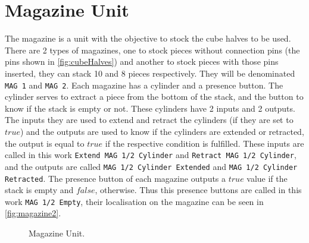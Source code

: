 \section{Magazine Unit}
\label{sec:magazine}
The magazine is a unit with the objective to stock the cube halves to be used.
There are 2 types of magazines, one to stock pieces without connection pins (the pins shown in \autoref{fig:cubeHalves}) and another to
 stock pieces with those pins inserted, they can stack 10 and 8 pieces
 respectively. They will be denominated \verb| MAG 1| and \verb|MAG 2|.
Each magazine has a cylinder and a presence button. The cylinder serves to extract a
piece from the bottom of the stack, and the button to know if the stack is empty
or not. These cylinders have 2 inputs and 2
outputs. The inputs they are used to extend and retract the cylinders (if they
are set to $true$) and the
outputs are used to know if the cylinders are extended or retracted, the output
is equal to $true$ if the respective condition is fulfilled. These
inputs  are called in this work \verb|Extend MAG 1/2 Cylinder| and
\verb|Retract MAG 1/2 Cylinder|, and the outputs are called \verb|MAG 1/2 Cylinder Extended| and
\verb|MAG 1/2 Cylinder Retracted|. The presence button of each magazine outputs a $true$
value if the stack is empty and $false$, otherwise. Thus this presence buttons
are called in this work \verb|MAG 1/2 Empty|, their localisation on the magazine
can be seen in \autoref{fig:magazine2}. 
\begin{figure}[H]
  \centering
  \caption{Magazine Unit.}
  \label{fig:magazine2}
\end{figure}

